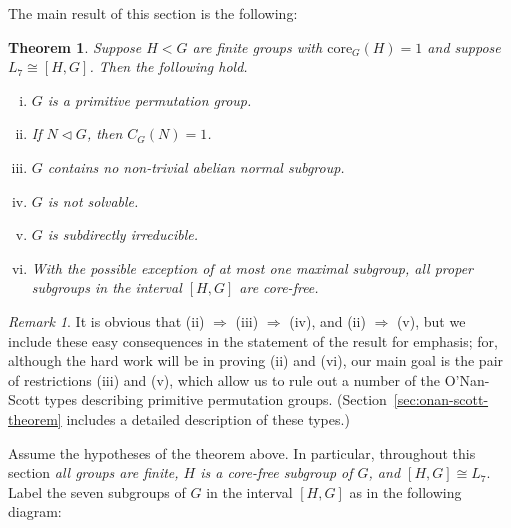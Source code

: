 \documentclass[cm,dissertation,actual,final]{uhthesis}
\theoremstyle{plain}
\newtheorem{theorem}{Theorem}[section]
\theoremstyle{definition}
\theoremstyle{remark}
\newtheorem*{remark}{Remark}
\numberwithin{theorem}{section}
\numberwithin{claim}{chapter}
\numberwithin{equation}{section}
\numberwithin{conjecture}{chapter}
\newcommand{\<}{\ensuremath{\langle}}
\renewcommand{\>}{\ensuremath{\rangle}}
\newcommand{\ssubnormal}{\ensuremath{\vartriangleleft}}
\newcommand{\core}{\ensuremath{\mathrm{core}}}
\newcommand{\0}{\ensuremath{\mathbf{0}}}
\newcommand{\1}{\ensuremath{\mathbf{1}}}
\newcommand{\2}{\ensuremath{\mathbf{2}}}
\newcommand{\3}{\ensuremath{\mathbf{3}}}
\newcommand{\4}{\ensuremath{\mathbf{4}}}
\newcommand{\5}{\ensuremath{\mathbf{5}}}
\begin{document}
The main result of this section is the following:
\begin{theorem}
\label{thm:except-seven-elem}
Suppose $H<G$ are finite groups with $\core_G(H) = 1$ and suppose
$L_7 \cong [H,G]$.  Then the following hold.
\begin{enumerate}[(i)]
\item $G$ is a primitive permutation group.
\item If $N\ssubnormal G$, then $C_G(N) = 1$.
\item $G$ contains no non-trivial abelian normal subgroup.
\item $G$ is not solvable.
\item $G$ is subdirectly irreducible.
\item With the possible exception of at most one maximal subgroup,
  all proper subgroups in the interval $[H,G]$ are core-free. 

\end{enumerate}
\end{theorem}
\begin{remark}
  It is obvious that (ii) $\Rightarrow$ (iii) $\Rightarrow$ (iv), and  (ii) $\Rightarrow$
  (v), but we include these easy consequences in the statement of the result for
  emphasis; for, although the hard work will be in proving (ii) and (vi), our
  main goal is the pair of restrictions (iii) and (v), which allow us to rule
  out a number of the O'Nan-Scott types describing primitive permutation
  groups.  (Section~\ref{sec:onan-scott-theorem} includes a detailed description
  of these types.) 
\end{remark}

Assume the hypotheses of the theorem above.  In particular, throughout this
section \emph{all groups are finite, $H$ is a core-free subgroup of $G$, and $[H,G] \cong
  L_7$}. Label the seven subgroups of $G$ in
the interval $[H,G]$ as in the following diagram:
\end{document}
